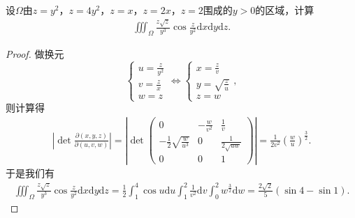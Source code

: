 \documentclass[../../main.tex]{subfiles}%
\begin{document}
\begin{example}
设$\Omega$由$z=y^2$，$z=4y^2$，$z=x$，$z=2x$，$z=2$围成的$y>0$的区域，计算
\begin{align*}
\iiint_{\Omega}\frac{z\sqrt{z}}{y^3}\cos\frac{z}{y^2}\mathrm{d}x\mathrm{d}y\mathrm{d}z.
\end{align*}
\end{example}

\begin{proof}

做换元
\[
\begin{cases}
u=\displaystyle\frac{z}{y^2}\\[4pt]
v=\displaystyle\frac{z}{x}\\[4pt]
w=z
\end{cases}
\iff
\begin{cases}
x=\displaystyle\frac{z}{v}\\[4pt]
y=\displaystyle\sqrt{\frac{z}{u}}\\[4pt]
z=w
\end{cases},
\]
则计算得
\begin{align*}
\left|\det \frac{\partial(x,y,z)}{\partial(u,v,w)}\right|
=\left|\det \begin{pmatrix}
0 & -\displaystyle\frac{w}{v^2} & \displaystyle\frac{1}{v}\\[6pt]
-\displaystyle\frac12\sqrt{\frac{w}{u^3}} & 0 & \displaystyle\frac{1}{2\sqrt{uw}}\\[6pt]
0 & 0 & 1
\end{pmatrix}\right|
=\frac{1}{2v^2}\left(\frac{w}{u}\right)^{\frac32}.
\end{align*}
于是我们有
\begin{align*}
\iiint_{\Omega}\frac{z\sqrt{z}}{y^3}\cos\frac{z}{y^2}\mathrm{d}x\mathrm{d}y\mathrm{d}z
=\frac12\int_{1}^{4}\cos u\mathrm{d}u\int_{1}^{2}\frac{1}{v^2}\mathrm{d}v\int_{0}^{2}w^{\frac32}\mathrm{d}w
=\frac{2\sqrt{2}}{5}(\sin4-\sin1).
\end{align*}
\end{proof}
\end{document}
